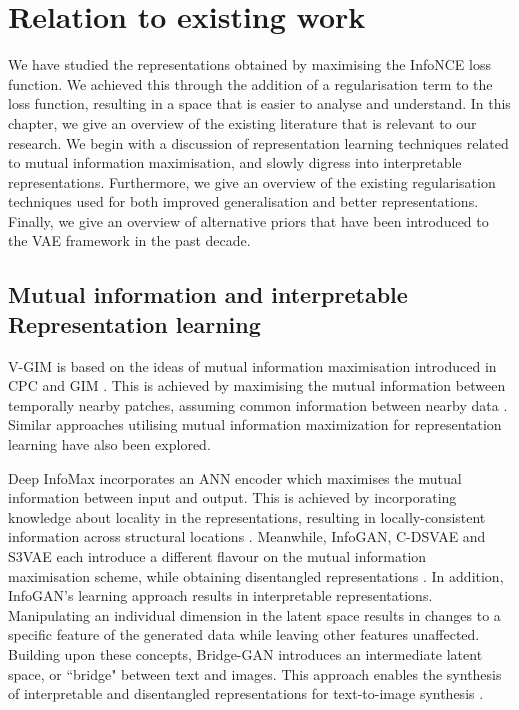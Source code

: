 
\chapter{Relation to existing work}

We have studied the representations obtained by maximising the InfoNCE loss function. We achieved this through the addition of a regularisation term to the loss function, resulting in a space that is easier to analyse and understand. In this chapter, we give an overview of the existing literature that is relevant to our research. We begin with a discussion of representation learning techniques related to mutual information maximisation, and slowly digress into interpretable representations. Furthermore, we give an overview of the existing regularisation techniques used for both improved generalisation and better representations. Finally, we give an overview of alternative priors that have been introduced to the VAE framework in the past decade.


\section{Mutual information and interpretable Representation learning}
	V-GIM is based on the ideas of mutual information maximisation introduced in CPC and GIM \cite{lowePuttingEndEndtoEnd2020, oordRepresentationLearningContrastive2019}. This is achieved by maximising the mutual information between temporally nearby patches, assuming common information between nearby data \cite{lowePuttingEndEndtoEnd2020}. Similar approaches utilising mutual information maximization for representation learning have also been explored.
	
	Deep InfoMax incorporates an ANN encoder which maximises the mutual information between input and output. This is achieved by incorporating knowledge about locality in the representations, resulting in locally-consistent information across structural locations \cite{hjelmLearningDeepRepresentations2019}. Meanwhile, InfoGAN, C-DSVAE and S3VAE each introduce a different flavour on the mutual information maximisation scheme, while obtaining disentangled representations \cite{chenInfoGANInterpretableRepresentation2016, baiContrastivelyDisentangledSequential2021, zhuS3VAESelfSupervisedSequential2020}. In addition, InfoGAN's learning approach results in interpretable representations. Manipulating an individual dimension in the latent space results in changes to a specific feature of the generated data while leaving other features unaffected. Building upon these concepts, Bridge-GAN introduces an intermediate latent space, or ``bridge" between text and images. This approach enables the synthesis of interpretable and disentangled representations for text-to-image synthesis \cite{yuanBridgeGANInterpretableRepresentation2020}.
	
